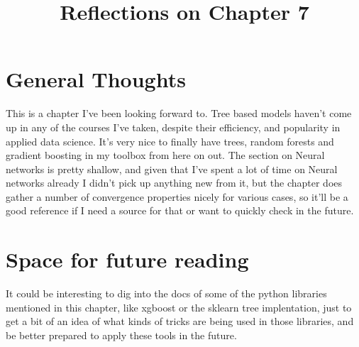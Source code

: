 \documentclass[10pt, english]{article}
\begin{document}
\title{Reflections on Chapter 7}
\date{}
\author{}

\maketitle


\section*{General Thoughts}
This is a chapter I've been looking forward to. Tree based models haven't come up in any of the courses I've taken, despite their efficiency, and popularity in applied data science. It's very nice to finally have trees, random forests and gradient boosting in my toolbox from here on out.
The section on Neural networks is pretty shallow, and given that I've spent a lot of time on Neural networks already I didn't pick up anything new from it, but the chapter does gather a number of convergence properties nicely for various cases, so it'll be a good reference if I need a source for that or want to quickly check in the future.


\section*{Space for future reading}
It could be interesting to dig into the docs of some of the python libraries mentioned in this chapter, like xgboost or the sklearn tree implentation, just to get a bit of an idea of what kinds of tricks are being used in those libraries, and be better prepared to apply these tools in the future.
\end{document}
